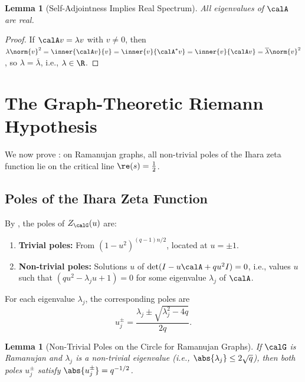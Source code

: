 \documentclass[12pt, a4paper]{article}
\theoremstyle{plain}
\newtheorem{lemma}[theorem]{Lemma}
\theoremstyle{definition}
\begin{document}
\begin{lemma}[Self-Adjointness Implies Real Spectrum]\label{lem:real}
  All eigenvalues of $\calA$ are real.
\end{lemma}

\begin{proof}
  If $\calA v = \lambda v$ with $v \neq 0$, then
  $\lambda \norm{v}^2 = \inner{\calA v}{v} = \inner{v}{\calA^* v}
  = \inner{v}{\calA v} = \overline{\lambda} \norm{v}^2$,
  so $\lambda = \overline{\lambda}$, i.e., $\lambda \in \R$.
\end{proof}

\section{The Graph-Theoretic Riemann Hypothesis}\label{sec:graph_rh}

We now prove : on Ramanujan graphs, all non-trivial poles
of the Ihara zeta function lie on the critical line $\re(s) = \frac{1}{2}$.

\subsection{Poles of the Ihara Zeta Function}

By , the poles of $Z_\calG(u)$ are:
\begin{enumerate}[label=(\roman*)]
  \item \textbf{Trivial poles:} From $(1-u^2)^{(q-1)n/2}$, located at $u = \pm 1$.
  \item \textbf{Non-trivial poles:} Solutions $u$ of
    $\det(I - u\calA + qu^2 I) = 0$, i.e., values $u$ such that
    $(qu^2 - \lambda_j u + 1) = 0$ for some eigenvalue $\lambda_j$ of $\calA$.
\end{enumerate}

For each eigenvalue $\lambda_j$, the corresponding poles are
\begin{equation}\label{eq:poles}
  u_j^{\pm} = \frac{\lambda_j \pm \sqrt{\lambda_j^2 - 4q}}{2q}.
\end{equation}

\begin{lemma}[Non-Trivial Poles on the Circle for Ramanujan Graphs]\label{lem:poles_circle}
  If $\calG$ is Ramanujan and $\lambda_j$ is a non-trivial eigenvalue (i.e.,
  $\abs{\lambda_j} \leq 2\sqrt{q}$), then both poles $u_j^{\pm}$ satisfy
  $\abs{u_j^{\pm}} = q^{-1/2}$.
\end{lemma}
\end{document}
